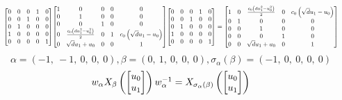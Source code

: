 \documentclass[11pt]{article}
\theoremstyle{definition}
\begin{document}
\[
\scaletoalign{\textwidth}{{\left[\begin{matrix}0 & 0 & 0 & 1 & 0\\0 & 0 & 1 & 0 & 0\\0 & 1 & 0 & 0 & 0\\1 & 0 & 0 & 0 & 0\\0 & 0 & 0 & 0 & 1\end{matrix}\right]} {\left[\begin{matrix}1 & 0 & 0 & 0 & 0\\0 & 1 & 0 & 0 & 0\\0 & 0 & 1 & 0 & 0\\0 & \frac{c_{0} \left(d u_{1}^{2} - u_{0}^{2}\right)}{2} & 0 & 1 & c_{0} \left(\sqrt{d} u_{1} - u_{0}\right)\\0 & \sqrt{d} u_{1} + u_{0} & 0 & 0 & 1\end{matrix}\right]} {\left[\begin{matrix}0 & 0 & 0 & 1 & 0\\0 & 0 & 1 & 0 & 0\\0 & 1 & 0 & 0 & 0\\1 & 0 & 0 & 0 & 0\\0 & 0 & 0 & 0 & 1\end{matrix}\right]} = {\left[\begin{matrix}1 & 0 & \frac{c_{0} \left(d u_{1}^{2} - u_{0}^{2}\right)}{2} & 0 & c_{0} \left(\sqrt{d} u_{1} - u_{0}\right)\\0 & 1 & 0 & 0 & 0\\0 & 0 & 1 & 0 & 0\\0 & 0 & 0 & 1 & 0\\0 & 0 & \sqrt{d} u_{1} + u_{0} & 0 & 1\end{matrix}\right]}}
\]
\[
\alpha = \left( -1, \  -1, \  0, \  0, \  0\right), \beta = \left( 0, \  1, \  0, \  0, \  0\right), \sigma_{\alpha}(\beta) = \left( -1, \  0, \  0, \  0, \  0\right)
\]
\[
\scaletoalign{\textwidth}{w_{\alpha} X_{\beta}\left(\left[\begin{matrix}u_{0}\\u_{1}\end{matrix}\right]\right) w_{\alpha}^{-1} = X_{\sigma_{\alpha}\left(\beta\right)}\left(\left[\begin{matrix}u_{0}\\u_{1}\end{matrix}\right]\right)}
\]
\end{document}
